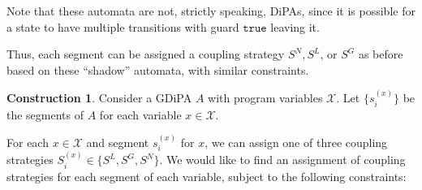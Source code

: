 \documentclass[12pt]{article}
\theoremstyle{definition}
\newtheorem{const}[thm]{Construction}
\begin{document}
Note that these automata are not, strictly speaking, DiPAs, since it is possible for a state to have multiple transitions with guard $\texttt{true}$ leaving it. 

Thus, each segment can be assigned a coupling strategy $S^N, S^L$, or $S^G$ as before based on these ``shadow'' automata, with similar constraints. 

\begin{const}\label{generalizedconstraintsystem}
    Consider a GDiPA $A$ with program variables $\mathcal{X}$. Let $\{s_i^{(x)}\}$ be the segments of $A$ for each variable $x\in \mathcal{X}$. 

    For each $x\in \mathcal{X}$ and segment $s_i^{(x)}$ for $x$, we can assign one of three coupling strategies $S_i^{(x)} \in \{S^L, S^G, S^N\}$. We would like to find an assignment of coupling strategies for each segment of each variable, subject to the following constraints: 


\end{const}
\end{document}
